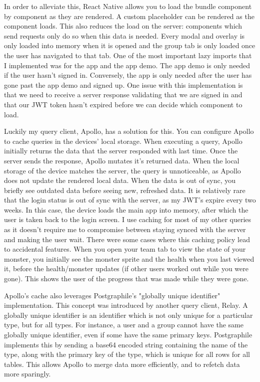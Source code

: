 \documentclass{l4proj}
\begin{document}
In order to alleviate this, React Native allows you to load the bundle component by component as they are rendered. A custom placeholder can be rendered as the component loads. This also reduces the load on the server: components which send requests only do so when this data is needed. Every modal and overlay is only loaded into memory when it is opened and the group tab is only loaded once the user has navigated to that tab. One of the most important lazy imports that I implemented was for the app and the app demo. The app demo is only needed if the user hasn't signed in. Conversely, the app is only needed after the user has gone past the app demo and signed up. One issue with this implementation is that we need to receive a server response validating that we are signed in and that our JWT token hasn't expired before we can decide which component to load. 

Luckily my query client, Apollo, has a solution for this. You can configure Apollo to cache queries in the devices' local storage. When executing a query, Apollo initially returns the data that the server responded with last time. Once the server sends the response, Apollo mutates it's returned data. When the local storage of the device matches the server, the query is unnoticeable, as Apollo does not update the rendered local data. When the data is out of sync, you briefly see outdated data before seeing new, refreshed data. It is relatively rare that the login status is out of sync with the server, as my JWT's expire every two weeks. In this case, the device loads the main app into memory, after which the user is taken back to the login screen. I use caching for most of my other queries as it doesn't require me to compromise between staying synced with the server and making the user wait. There were some cases where this caching policy lead to accidental features. When you open your team tab to view the state of your monster, you initially see the monster sprite and the health when you last viewed it, before the health/monster updates (if other users worked out while you were gone). This shows the user of the progress that was made while they were gone.

Apollo's cache also leverages Postgraphile's "globally unique identifier" implementation. This concept was introduced by another query client, Relay. A globally unique identifier is an identifier which is not only unique for a particular type, but for all types. For instance, a user and a group cannot have the same globally unique identifier, even if some have the same primary keys. Postgraphile implements this by sending a base64 encoded string containing the name of the type, along with the primary key of the type, which is unique for all rows for all tables. This allows Apollo to merge data more efficiently, and to refetch data more sparingly.
\end{document}
